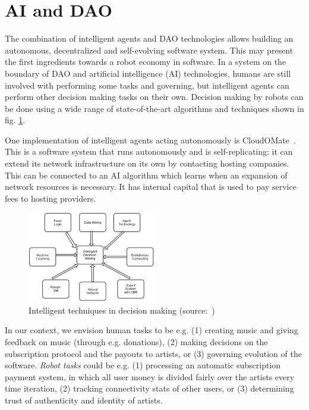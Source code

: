 \section{AI and DAO}
The combination of intelligent agents and DAO technologies allows building an autonomous, decentralized and self-evolving software system. This may present the first ingredients towards a robot economy in software. In a system on the boundary of DAO and artificial intelligence (AI) technologies, humans are still involved with performing some tasks and governing, but intelligent agents can perform other decision making tasks on their own. Decision making by robots can be done using a wide range of state-of-the-art algorithms and techniques shown in fig. \ref{fig:ai-techniques}.

One implementation of intelligent agents acting autonomously is CloudOMate~\citep{jaspers2018plebnet}. This is a software system that runs autonomously and is self-replicating: it can extend its network infrastructure on its own by contacting hosting companies. This can be connected to an AI algorithm which learns when an expansion of network resources is necessary. It has internal capital that is used to pay service fees to hosting providers.

\begin{figure}
    \centering
    \includegraphics[width=0.5\textwidth]{related-work/intelligent-decision-making.png}
    \caption{Intelligent techniques in decision making (source:~\cite{das2016intelligent})}
    \label{fig:ai-techniques}
\end{figure}

In our context, we envision human tasks to be e.g. (1) creating music and giving feedback on music (through e.g. donations), (2) making decisions on the subscription protocol and the payouts to artists, or (3) governing evolution of the software. \textit{Robot tasks} could be e.g. (1) processing an automatic subscription payment system, in which all user money is divided fairly over the artists every time iteration, (2) tracking connectivity stats of other users, or (3) determining trust of authenticity and identity of artists.

